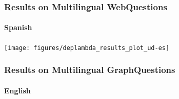 \documentclass[mathserif,12pt]{beamer}
\begin{document}
\begin{frame}
\frametitle{Results on Multilingual WebQuestions}
\framesubtitle{Spanish}
\centering
\large
\vspace{0.4em}
\texttt{[image: figures/deplambda\_results\_plot\_ud-es]}
\end{frame}

\begin{frame}
\frametitle{Results on Multilingual GraphQuestions}
\framesubtitle{English}
\large
\vspace{0.4em}

\end{frame}
\end{document}
